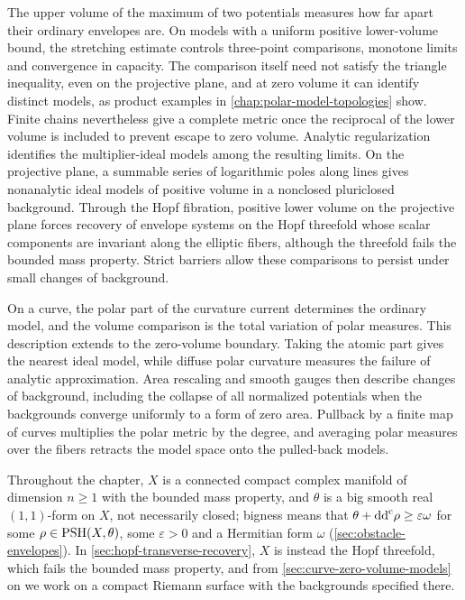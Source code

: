 The upper volume of the maximum of two potentials measures how far apart their ordinary envelopes are. On models with a uniform positive lower-volume bound, the stretching estimate controls three-point comparisons, monotone limits and convergence in capacity. The comparison itself need not satisfy the triangle inequality, even on the projective plane, and at zero volume it can identify distinct models, as product examples in \cref{chap:polar-model-topologies} show. Finite chains nevertheless give a complete metric once the reciprocal of the lower volume is included to prevent escape to zero volume. Analytic regularization identifies the multiplier-ideal models among the resulting limits. On the projective plane, a summable series of logarithmic poles along lines gives nonanalytic ideal models of positive volume in a nonclosed pluriclosed background. Through the Hopf fibration, positive lower volume on the projective plane forces recovery of envelope systems on the Hopf threefold whose scalar components are invariant along the elliptic fibers, although the threefold fails the bounded mass property. Strict barriers allow these comparisons to persist under small changes of background.

On a curve, the polar part of the curvature current determines the ordinary model, and the volume comparison is the total variation of polar measures. This description extends to the zero-volume boundary. Taking the atomic part gives the nearest ideal model, while diffuse polar curvature measures the failure of analytic approximation. Area rescaling and smooth gauges then describe changes of background, including the collapse of all normalized potentials when the backgrounds converge uniformly to a form of zero area. Pullback by a finite map of curves multiplies the polar metric by the degree, and averaging polar measures over the fibers retracts the model space onto the pulled-back models.

Throughout the chapter, $X$ is a connected compact complex manifold of dimension $n\geq1$ with the bounded mass property, and $\theta$ is a big smooth real $(1,1)$-form on $X$, not necessarily closed; bigness means that $\theta+\mathrm{dd}^{\mathrm{c}}\rho\geq\varepsilon\omega$ for some $\rho\in\mathrm{PSH}(X,\theta)$, some $\varepsilon>0$ and a Hermitian form $\omega$ (\cref{sec:obstacle-envelopes}). In \cref{sec:hopf-transverse-recovery}, $X$ is instead the Hopf threefold, which fails the bounded mass property, and from \cref{sec:curve-zero-volume-models} on we work on a compact Riemann surface with the backgrounds specified there.

